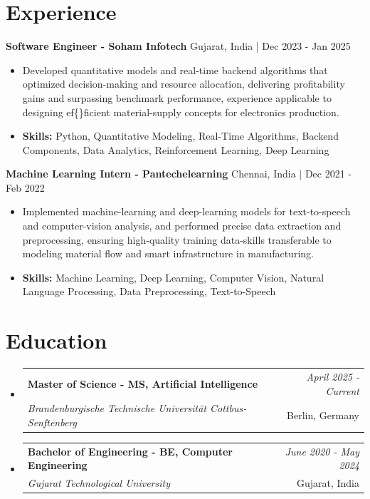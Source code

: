 \documentclass[a4paper,11pt]{article}
\makeatletter
\newcommand{\resumeSubheading}[4]{
\vspace{0.5mm}\item
    \begin{tabular*}{\linewidth}[t]{l@{\extracolsep{\fill}}r}
        \textbf{#1} & \textit{\footnotesize{#4}} \\
        \textit{\footnotesize{#3}} &  \footnotesize{#2}\\
    \end{tabular*}
    \vspace{-2.4mm}
}
\makeatother
\begin{document}
\section{\textbf{Experience}}


\vspace{1mm}
  \textbf{Software Engineer - Soham Infotech} \hfill Gujarat, India | Dec 2023 - Jan 2025
\vspace{-1.5mm} %
\begin{itemize}
  \item Developed quantitative models and real-time backend algorithms that optimized decision-making and resource allocation, delivering profitability gains and surpassing benchmark performance, experience applicable to designing ef\{\}ficient material-supply concepts for electronics production.

\vspace{-2mm}
  \item \textbf{Skills:} Python, Quantitative Modeling, Real-Time Algorithms, Backend Components, Data Analytics, Reinforcement Learning, Deep Learning
\end{itemize}

\vspace{1mm}
  \textbf{Machine Learning Intern - Pantechelearning} \hfill Chennai, India | Dec 2021 - Feb 2022
\vspace{-1.5mm} %
\begin{itemize}
  \item Implemented machine-learning and deep-learning models for text-to-speech and computer-vision analysis, and performed precise data extraction and preprocessing, ensuring high-quality training data-skills transferable to modeling material flow and smart infrastructure in manufacturing.
\vspace{-2mm}
  \item \textbf{Skills:} Machine Learning, Deep Learning, Computer Vision, Natural Language Processing, Data Preprocessing, Text-to-Speech
\end{itemize}\section{\textbf{Education}}
\vspace{-0.4mm}

\begin{itemize}[leftmargin=0.15in, label={}]
\resumeSubheading
{Master of Science - MS, Artificial Intelligence }{Berlin, Germany}
{Brandenburgische Technische Universität Cottbus-Senftenberg  }{April 2025 - Current}

\vspace{1.0mm} %
\resumeSubheading
{Bachelor of Engineering - BE, Computer Engineering  }{Gujarat, India}
{Gujarat Technological University }{June 2020 - May 2024}

\end{itemize}
\end{document}
